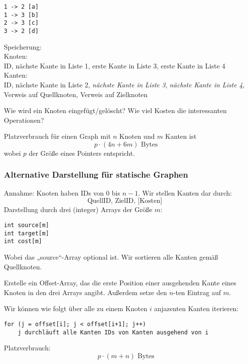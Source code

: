 \documentclass[11pt]{scrartcl}
\begin{document}
\begin{ex}\- 
\begin{verbatim}
1 -> 2 [a]
1 -> 3 [b]
2 -> 3 [c]
3 -> 2 [d]
\end{verbatim}
\end{ex}

Speicherung:\\
Knoten:\\
ID, nächste Kante in Liste 1, erste Kante in Liste 3, erste Kante in Liste 4
Kanten:\\
ID, nächste Kante in Liste 2, \emph{nächste Kante in Liste 3}, \emph{nächste Kante in Liste 4}, Verweis auf Quellknoten, Verweis auf Zielknoten

\begin{note}[Übung]
Wie wird ein Knoten eingefügt/gelöscht?
Wie viel Kosten die interessanten Operationen?
\end{note}

Platzverbrauch für einen Graph mit $n$ Knoten und $m$ Kanten ist
\[
p\cdot(4n + 6m) \text{ Bytes}
\]
wobei $p$ der Größe eines Pointers entspricht.


\subsubsection{Alternative Darstellung für statische Graphen}
Annahme: Knoten haben IDs von $0$ bis $n-1$.
Wir stellen Kanten dar durch:
\[
\text{QuellID, ZielID, [Kosten] }
\]
Darstellung durch drei (integer) Arrays der Größe $m$:
\begin{verbatim}
int source[m]
int target[m]
int cost[m]
\end{verbatim}
Wobei das „source“-Array optional ist.
Wir sortieren alle Kanten gemäß Quellknoten.

Erstelle ein Offset-Array, das die erste Position einer ausgehenden Kante eines Knoten in den drei Arrays angibt.
Außerdem setze den $n$-ten Eintrag auf $m$.

Wir können wie folgt über alle zu einem Knoten $i$ anjazenten Kanten iterieren:
\begin{verbatim}
for (j = offset[i]; j < offset[i+1]; j++)
    j durchläuft alle Kanten IDs von Kanten ausgehend von i
\end{verbatim}

Platzverbrauch:
\[
p\cdot (m+n) \text{ Bytes}
\]
\end{document}
